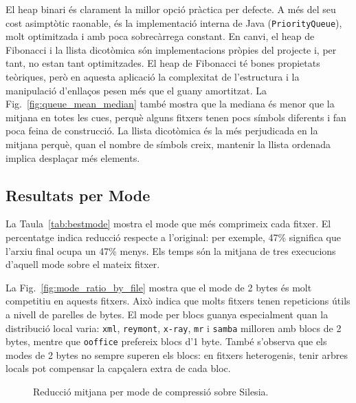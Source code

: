 \documentclass[conference,compsoc]{IEEEtran}
\begin{document}
El heap binari és clarament la millor opció pràctica per defecte. A més del
seu cost asimptòtic raonable, és la implementació interna de Java
(\texttt{PriorityQueue}), molt optimitzada i amb poca sobrecàrrega constant.
En canvi, el heap de Fibonacci i la llista dicotòmica són implementacions
pròpies del projecte i, per tant, no estan tant optimitzades.
El heap de Fibonacci té bones propietats teòriques, però en aquesta aplicació la
complexitat de l'estructura i la manipulació d'enllaços pesen més que el
guany amortitzat. La Fig.~\ref{fig:queue_mean_median} també mostra que la
mediana és menor que la mitjana en totes les cues, perquè alguns fitxers
tenen pocs símbols diferents i fan poca feina de construcció. La llista
dicotòmica és la més perjudicada en la mitjana perquè, quan el nombre de
símbols creix, mantenir la llista ordenada implica desplaçar més elements.

\subsection{Resultats per Mode}

La Taula~\ref{tab:bestmode} mostra el mode que més comprimeix cada fitxer.
El percentatge indica reducció respecte a l'original: per exemple, 47\%
significa que l'arxiu final ocupa un 47\% menys. Els temps són la mitjana
de tres execucions d'aquell mode sobre el mateix fitxer.

La Fig.~\ref{fig:mode_ratio_by_file} mostra que el mode de 2 bytes és molt
competitiu en aquests fitxers. Això indica que molts fitxers tenen
repeticions útils a nivell de parelles de bytes. El mode per blocs guanya
especialment quan la distribució local varia: \texttt{xml}, \texttt{reymont},
\texttt{x-ray}, \texttt{mr} i \texttt{samba} milloren amb blocs de 2 bytes,
mentre que \texttt{ooffice} prefereix blocs d'1 byte. També s'observa que
els modes de 2 bytes no sempre superen els blocs: en fitxers heterogenis,
tenir arbres locals pot compensar la capçalera extra de cada bloc.

\begin{figure}[H]
    \centering
    \modedata
    \caption{Reducció mitjana per mode de compressió sobre Silesia.}
    \label{fig:mode_ratio}
\end{figure}
\end{document}
